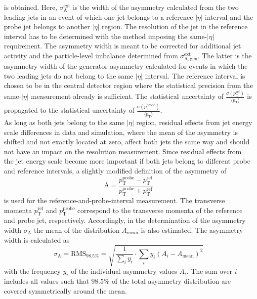 is obtained. Here, $\sigma_\mathrm{A}^\mathrm{ext}$ is the width of the asymmetry calculated from the two leading jets in an event of which one jet belongs to a reference $|\eta|$ interval and the probe jet belongs to another $|\eta|$ region. The resolution of the jet in the reference interval has to be determined with the method imposing the same-$|\eta|$ requirement. The asymmetry width is meant to be corrected for additional jet activity and the particle-level imbalance determined from $\sigma_\mathrm{A, \mathrm{gen}}^\mathrm{ext}$. The latter is the asymmetry width of the generator asymmetry calculated for events in which the two leading jets do not belong to the same $|\eta|$ interval. The reference interval is chosen to be in the central detector region where the statistical precision from the same-$|\eta|$ measurement already is sufficient. The statistical uncertainty of $\frac{\sigma (p^\mathrm{ref}_\mathrm{T})}{{\langle p_\mathrm{T} \rangle}}$ is propagated to the statistical uncertainty of $\frac{\sigma (p^\mathrm{probe}_\mathrm{T})}{\langle p_\mathrm{T} \rangle}$. \\
As long as both jets belong to the same $|\eta|$ region, residual effects from jet energy scale differences in data and simulation, where the mean of the asymmetry is shifted and not exactly located at zero, affect both jets the same way and should not have an impact on the resolution measurement. Since residual effects from the jet energy scale become more important if both jets belong to different probe and reference intervals, a slightly modified definition of the asymmetry of
\begin{equation}
\label{eq:forwardasymmdef}
  \mathrm{A} = \frac{p^\mathrm{probe}_{\mathrm{T}} - p^\mathrm{ref}_{\mathrm{T}}}{p^\mathrm{probe}_{\mathrm{T}} + p^\mathrm{ref}_{\mathrm{T}}} 
 \end{equation}
is used for the reference-and-probe-interval measurement. The transverse momenta $p^\mathrm{ref}_{\mathrm{T}}$ and $p^\mathrm{probe}_{\mathrm{T}}$ correspond to the transverse momenta of the reference and probe jet, respectively. Accordingly, in the determination of the asymmetry width $\sigma_\mathrm{A}$ the mean of the distribution $A_\mathrm{mean}$ is also estimated. The asymmetry width is calculated as
\begin{equation}
\label{eq:forwardasymmwidthdef}
  \sigma_\mathrm{A} = \mathrm{RMS}_{98.5\%} = \sqrt{\frac{1}{\sum_{i} y_i} \cdot \sum_{i} y_i (A_i-A_\mathrm{mean})^2} 
 \end{equation}
with the frequency $y_i$ of the individual asymmetry values $A_i$. The sum over $i$ includes all values such that $98.5\%$ of the total asymmetry distribution are covered symmetrically around the mean.\\
